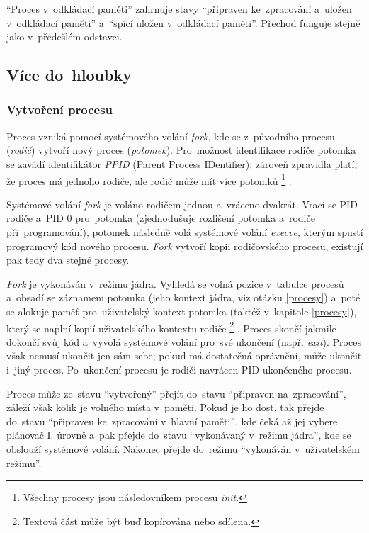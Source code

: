 \enquote{Proces v~odkládací paměti} zahrnuje stavy \enquote{připraven ke~zpracování a~uložen v~odkládací paměti} a~\enquote{spící uložen v~odkládací paměti}. Přechod funguje stejně jako v~předešlém odstavci.

\subsection{Více do~hloubky}

\subsubsection{Vytvoření procesu}

Proces vzniká pomocí systémového volání \emph{fork}, kde se z~původního procesu (\emph{rodič}) vytvoří nový proces (\emph{potomek}). Pro~možnost identifikace rodiče potomka se zavádí identifikátor \emph{PPID} (Parent Process IDentifier); zároveň zpravidla platí, že proces má jednoho rodiče, ale rodič může mít více potomků%
\footnote{Všechny procesy jsou následovníkem procesu \emph{init}.}%
.

Systémové volání \emph{fork} je voláno rodičem jednou a~vráceno dvakrát. Vrací se PID rodiče a~PID 0 pro~potomka (zjednodušuje rozlišení potomka a~rodiče při~programování), potomek následně volá systémové volání \emph{execve}, kterým spustí programový kód nového procesu. \emph{Fork} vytvoří kopii rodičovského procesu, existují pak tedy dva stejné procesy.

\emph{Fork} je vykonáván v~režimu jádra. Vyhledá se volná pozice v~tabulce procesů a~obsadí se záznamem potomka (jeho kontext jádra, viz otázku \ref{procesy}) a~poté se alokuje paměť pro~uživatelský kontext potomka (taktéž v~kapitole \ref{procesy}), který se naplní kopií uživatelského kontextu rodiče%
\footnote{Textová část může být buď kopírována nebo sdílena.}%
. Proces skončí jakmile dokončí svůj kód a~vyvolá systémové volání pro~své ukončení (např. \emph{exit}). Proces však nemusí ukončit jen sám sebe; pokud má dostatečná oprávnění, může ukončit i~jiný proces. Po~ukončení procesu je rodiči navrácen PID ukončeného procesu.

Proces může ze~stavu \enquote{vytvořený} přejít do~stavu \enquote{připraven na~zpracování}, záleží však kolik je volného místa v~paměti. Pokud je ho dost, tak přejde do~stavu \enquote{připraven ke~zpracování v~hlavní paměti}, kde čeká až jej vybere plánovač I. úrovně a~pak přejde do~stavu \enquote{vykonávaný v~režimu jádra}, kde se obslouží systémové volání. Nakonec přejde do~režimu \enquote{vykonáván v~uživatelském režimu}.

